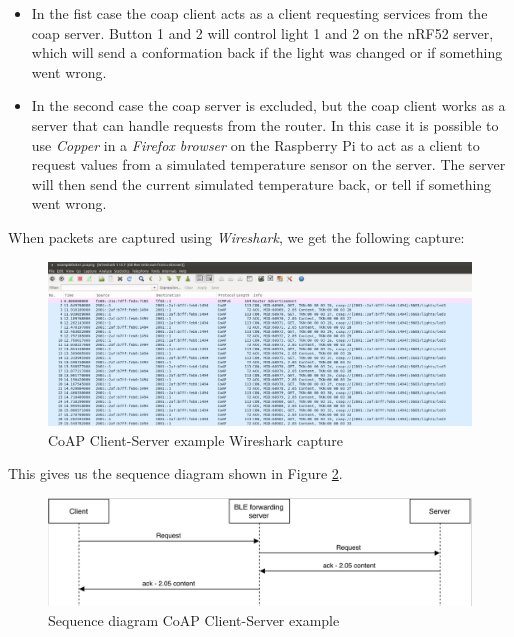 \begin{itemize}
  \item In the fist case the \gls{coap} client acts as a client requesting services from the \gls{coap} server. Button 1 and 2 will control light 1 and 2 on the nRF52 server, which will send a conformation back if the light was changed or if something went wrong.
  \item In the second case the \gls{coap} server is excluded, but the \gls{coap} client works as a server that can handle requests from the router. In this case it is possible to use \textit{Copper} in a \textit{Firefox browser} on the Raspberry Pi to act as a client to request values from a simulated temperature sensor on the server. The server will  then send the current simulated temperature back, or tell if something went wrong. 
\end{itemize} 

When packets are captured using \textit{Wireshark}, we get the following capture: 

\begin{figure}[h]
    \centering
    \includegraphics[scale=0.27]{CoapEx1captureCropped2.png}    
    \caption{CoAP Client-Server example Wireshark capture}
    \label{fig:CoAPexample1}
\end{figure}


This gives us the sequence diagram shown in Figure \ref{fig:seq1}. 

\begin{figure}[h]
    \centering
    \includegraphics[scale=0.27]{seq1.png}    
    \caption{Sequence diagram CoAP Client-Server example}
    \label{fig:seq1}
\end{figure}

